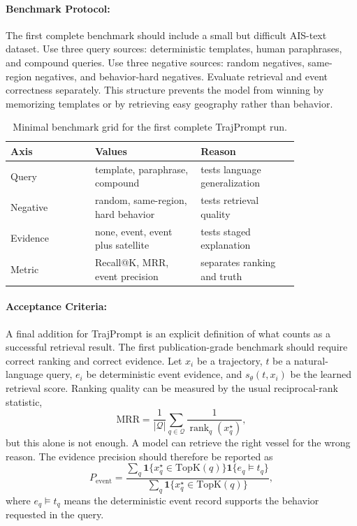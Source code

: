 \documentclass{article}
\begin{document}
\paragraph{Benchmark Protocol:}

The first complete benchmark should include a small but difficult AIS-text dataset. Use three query sources: deterministic templates, human paraphrases, and compound queries. Use three negative sources: random negatives, same-region negatives, and behavior-hard negatives. Evaluate retrieval and event correctness separately. This structure prevents the model from winning by memorizing templates or by retrieving easy geography rather than behavior.

\begin{table}[t]
\centering
\caption{Minimal benchmark grid for the first complete TrajPrompt run.}
\begin{tabular}{@{}p{0.24\linewidth}p{0.30\linewidth}p{0.28\linewidth}@{}}
\toprule
\textbf{Axis} & \textbf{Values} & \textbf{Reason}\\
\midrule
Query & template, paraphrase, compound & tests language generalization\\
Negative & random, same-region, hard behavior & tests retrieval quality\\
Evidence & none, event, event plus satellite & tests staged explanation\\
Metric & Recall@K, MRR, event precision & separates ranking and truth\\
\bottomrule
\end{tabular}
\end{table}

\paragraph{Acceptance Criteria:}

A final addition for TrajPrompt is an explicit definition of what counts as a successful retrieval result. The first publication-grade benchmark should require correct ranking and correct evidence. Let $x_i$ be a trajectory, $t$ be a natural-language query, $e_i$ be deterministic event evidence, and $s_\theta(t,x_i)$ be the learned retrieval score. Ranking quality can be measured by the usual reciprocal-rank statistic,
\begin{equation}
  \mathrm{MRR} =
  \frac{1}{|\mathcal{Q}|}
  \sum_{q \in \mathcal{Q}}
  \frac{1}{\operatorname{rank}_q(x_q^\star)} ,
\end{equation}
but this alone is not enough. A model can retrieve the right vessel for the wrong reason. The evidence precision should therefore be reported as
\begin{equation}
  P_{\mathrm{event}} =
  \frac{
    \sum_q \mathbf{1}\{x_q^\star \in \mathrm{TopK}(q)\}
    \mathbf{1}\{e_q \models t_q\}
  }{
    \sum_q \mathbf{1}\{x_q^\star \in \mathrm{TopK}(q)\}
  },
\end{equation}
where $e_q \models t_q$ means the deterministic event record supports the behavior requested in the query.
\end{document}
